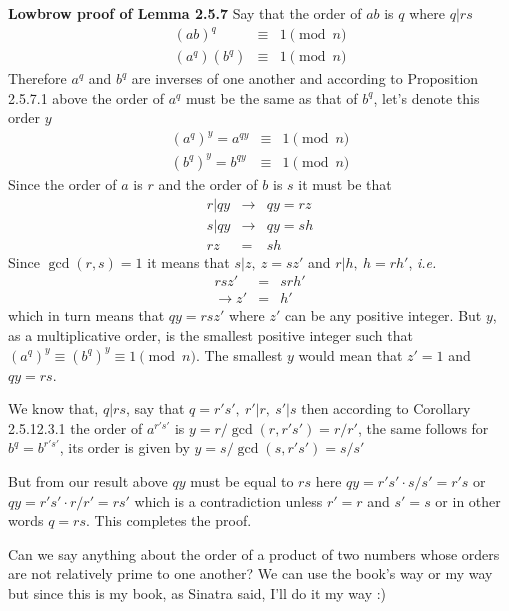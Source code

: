 \documentclass[aps,preprint,preprintnumbers,nofootinbib,showpacs,prd]{revtex4-1}
\newcommand{\ie}{{\it i.e.} }
\newcommand{\nbea}{\begin{eqnarray*}}
\newcommand{\neea}{\end{eqnarray*}}
\begin{document}
{\bf Lowbrow proof of Lemma 2.5.7} Say that the order of $ab$ is $q$ where $q | rs$
%
\nbea
(ab)^q & \equiv & 1 \pmod{n} \\
(a^q)(b^q) & \equiv & 1 \pmod{n}
\neea
%
Therefore $a^q$ and $b^q$ are inverses of one another and according to Proposition 2.5.7.1 above the order of $a^q$ must be the same as that of $b^q$, let's denote this order $y$
%
\nbea
(a^q)^y  = a^{qy} & \equiv & 1 \pmod{n} \\
(b^q)^y  = b^{qy} & \equiv & 1 \pmod{n}
\neea
%
Since the order of $a$ is $r$ and the order of $b$ is $s$ it must be that
%
\nbea
r | qy & \to & qy = rz \\
s | qy & \to & qy = sh \\
rz & = & sh
\neea
%
Since $\gcd(r,s) = 1$ it means that $s|z, ~z = sz'$ and $r|h, ~h = rh'$, \ie
%
\nbea
rsz' & = & srh' \\
\to z' & = & h'
\neea
%
which in turn means that $qy = rs z'$ where $z'$ can be any positive integer. But $y$, as a multiplicative order, is the smallest positive integer such that $(a^q)^y \equiv (b^q)^y \equiv 1 \pmod{n}$. The smallest $y$ would mean that $z' = 1$ and $qy = rs$.

We know that, $q|rs$, say that $q = r's',~r'|r,~s'|s$ then according to Corollary 2.5.12.3.1 the order of $a^{r's'}$ is $y = r/\gcd(r,r's') = r/r'$, the same follows for $b^q = b^{r's'}$, its order  is given by $y = s/\gcd(s,r's') = s/s'$

But from our result above $qy$ must be equal to $rs$ here $qy = r's' \cdot s/s' = r's$ or $qy = r's' \cdot r/r' = rs'$ which is a contradiction unless $r'=r$ and $s'=s$ or in other words $q = rs$. This completes the proof.

Can we say anything about the order of a product of two numbers whose orders are not relatively prime to one another? We can use the book's way or my way but since this is my book, as Sinatra said, I'll do it my way :)
\end{document}
